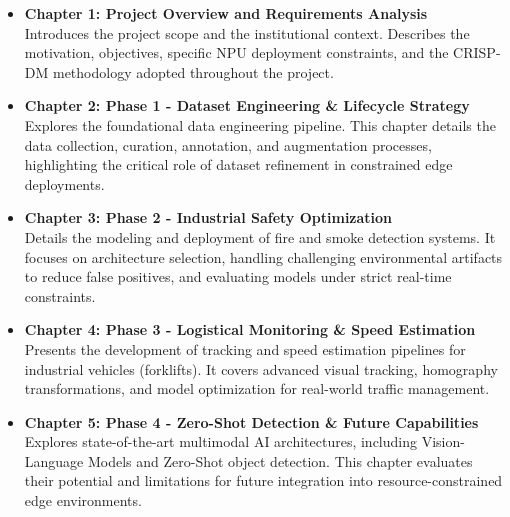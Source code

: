 \begin{itemize}
    \item \textbf{Chapter 1: Project Overview and Requirements Analysis} \\
    Introduces the project scope and the institutional context. Describes the motivation, objectives, specific NPU deployment constraints, and the CRISP-DM methodology adopted throughout the project.
    
    \item \textbf{Chapter 2: Phase 1 - Dataset Engineering \& Lifecycle Strategy} \\
    Explores the foundational data engineering pipeline. This chapter details the data collection, curation, annotation, and augmentation processes, highlighting the critical role of dataset refinement in constrained edge deployments.
    
    \item \textbf{Chapter 3: Phase 2 - Industrial Safety Optimization} \\
    Details the modeling and deployment of fire and smoke detection systems. It focuses on architecture selection, handling challenging environmental artifacts to reduce false positives, and evaluating models under strict real-time constraints.
    
    \item \textbf{Chapter 4: Phase 3 - Logistical Monitoring \& Speed Estimation} \\
    Presents the development of tracking and speed estimation pipelines for industrial vehicles (forklifts). It covers advanced visual tracking, homography transformations, and model optimization for real-world traffic management.
    
    \item \textbf{Chapter 5: Phase 4 - Zero-Shot Detection \& Future Capabilities} \\
    Explores state-of-the-art multimodal AI architectures, including Vision-Language Models and Zero-Shot object detection. This chapter evaluates their potential and limitations for future integration into resource-constrained edge environments.
\end{itemize}
